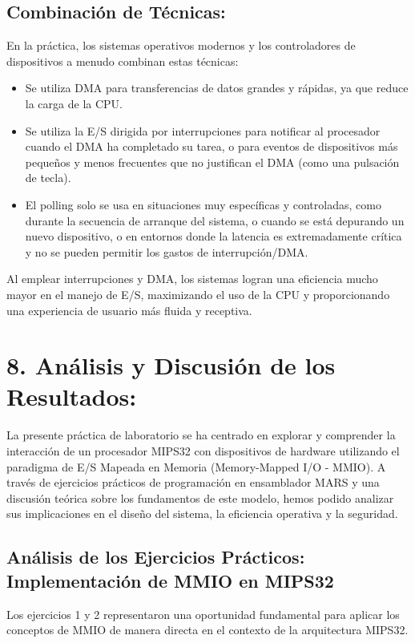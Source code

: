 \documentclass[12pt, a4paper]{article}
\begin{document}
\subsection*{Combinación de Técnicas:}
En la práctica, los sistemas operativos modernos y los controladores de dispositivos a menudo combinan estas técnicas:
\begin{itemize}
    \item Se utiliza DMA para transferencias de datos grandes y rápidas, ya que reduce la carga de la CPU.
    \item Se utiliza la E/S dirigida por interrupciones para notificar al procesador cuando el DMA ha completado su tarea, o para eventos de dispositivos más pequeños y menos frecuentes que no justifican el DMA (como una pulsación de tecla).
    \item El polling solo se usa en situaciones muy específicas y controladas, como durante la secuencia de arranque del sistema, o cuando se está depurando un nuevo dispositivo, o en entornos donde la latencia es extremadamente crítica y no se pueden permitir los gastos de interrupción/DMA.
\end{itemize}
Al emplear interrupciones y DMA, los sistemas logran una eficiencia mucho mayor en el manejo de E/S, maximizando el uso de la CPU y proporcionando una experiencia de usuario más fluida y receptiva.

\section*{8. Análisis y Discusión de los Resultados:}
La presente práctica de laboratorio se ha centrado en explorar y comprender la interacción de un procesador MIPS32 con dispositivos de hardware utilizando el paradigma de E/S Mapeada en Memoria (Memory-Mapped I/O - MMIO). A través de ejercicios prácticos de programación en ensamblador MARS y una discusión teórica sobre los fundamentos de este modelo, hemos podido analizar sus implicaciones en el diseño del sistema, la eficiencia operativa y la seguridad.

\subsection*{Análisis de los Ejercicios Prácticos: Implementación de MMIO en MIPS32}
Los ejercicios 1 y 2 representaron una oportunidad fundamental para aplicar los conceptos de MMIO de manera directa en el contexto de la arquitectura MIPS32.
\end{document}
